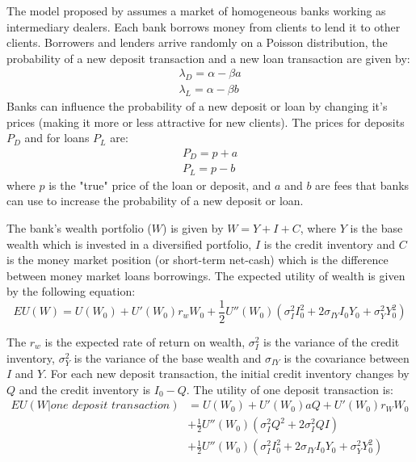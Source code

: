 The model proposed by  assumes a market of homogeneous banks working as intermediary dealers. Each bank borrows money from clients to lend it to other clients. Borrowers and lenders arrive randomly on a Poisson distribution, the probability of a new deposit transaction and a new loan transaction are given by: 
\begin{align}
  \lambda_D = \alpha - \beta a \\
  \lambda_L = \alpha - \beta b
\end{align} 
Banks can influence the probability of a new deposit or loan by changing it's prices (making it more or less attractive for new clients). The prices for deposits $P_D$ and for loans $P_L$ are:
\begin{align}
  P_D = p+a \\
  P_L = p-b 
\end{align}
where $p$ is the "true" price of the loan or deposit, and $a$ and $b$ are fees that banks can use to increase the probability of a new deposit or loan.

The bank's wealth portfolio ($W$) is given by $W = Y + I + C$, where $Y$ is the base wealth which is invested in a diversified portfolio, $I$ is the credit inventory and $C$ is the money market position (or short-term net-cash) which is the difference between money market loans borrowings. The expected utility of wealth is given by the following equation:
\begin{equation}
  EU(W) = U(W_0) + U'(W_0)r_w W_0 + \frac{1}{2}U''(W_0)(\sigma_I^2 I_0^2 + 2\sigma_{IY} I_0 Y_0 + \sigma_Y^2 Y_0^2)
\end{equation}

The $r_w$ is the expected rate of return on wealth, $\sigma_I^2$ is the variance of the credit inventory, $\sigma_Y^2$ is the variance of the base wealth and $\sigma_{IY}$ is the covariance between $I$ and $Y$. For each new deposit transaction, the initial credit inventory changes by $Q$ and the credit inventory is $I_0 - Q$. The utility of one deposit transaction is:
\begin{equation}
  \begin{aligned}
    EU(W|\textit{one deposit transaction}) &= U(W_0) + U'(W_0)aQ +  U'(W_0)r_W W_0 \\ &+ \frac{1}{2}U''(W_0)(\sigma_I^2 Q^2 + 2\sigma_I^2 QI) \\ &+\frac{1}{2}U''(W_0)(\sigma_I^2 I_0^2 + 2\sigma_{IY} I_0 Y_0 + \sigma_Y^2 Y_0^2)
  \end{aligned}
\end{equation}

